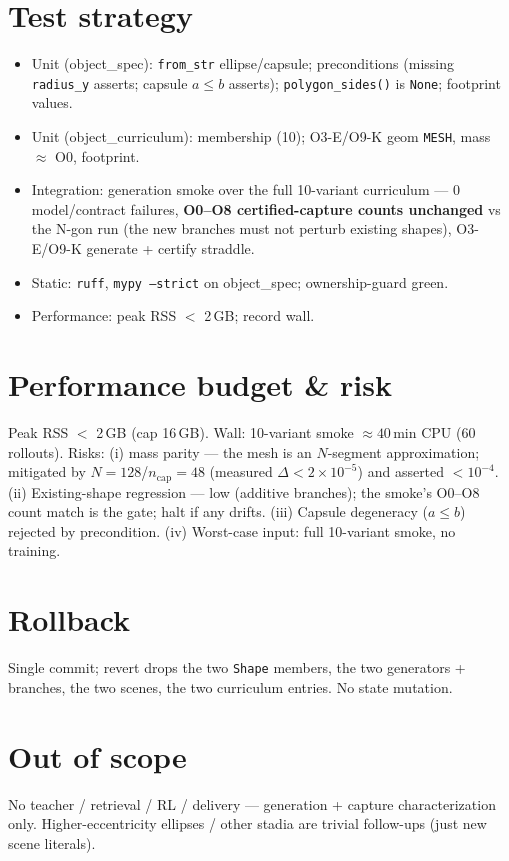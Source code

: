 \documentclass[11pt]{article}
\begin{document}
\section{Test strategy}
\begin{itemize}[nosep]
  \item Unit (object\_spec): \texttt{from\_str} ellipse/capsule; preconditions (missing \texttt{radius\_y}
    asserts; capsule $a\le b$ asserts); \texttt{polygon\_sides()} is \texttt{None}; footprint values.
  \item Unit (object\_curriculum): membership (10); O3-E/O9-K geom \texttt{MESH}, mass $\approx$ O0, footprint.
  \item Integration: generation smoke over the full 10-variant curriculum --- 0 model/contract failures,
    \textbf{O0--O8 certified-capture counts unchanged} vs the N-gon run (the new branches must not perturb
    existing shapes), O3-E/O9-K generate + certify straddle.
  \item Static: \texttt{ruff}, \texttt{mypy --strict} on object\_spec; ownership-guard green.
  \item Performance: peak RSS $<$ 2\,GB; record wall.
\end{itemize}

\section{Performance budget \& risk}
Peak RSS $<$ 2\,GB (cap 16\,GB). Wall: 10-variant smoke $\approx 40$\,min CPU (60 rollouts). Risks:
(i) mass parity --- the mesh is an $N$-segment approximation; mitigated by $N{=}128$/$n_{\text{cap}}{=}48$
(measured $\Delta<2\times10^{-5}$) and asserted $<10^{-4}$. (ii) Existing-shape regression --- low (additive
branches); the smoke's O0--O8 count match is the gate; halt if any drifts. (iii) Capsule degeneracy
($a\le b$) rejected by precondition. (iv) Worst-case input: full 10-variant smoke, no training.

\section{Rollback}
Single commit; revert drops the two \texttt{Shape} members, the two generators + branches, the two scenes,
the two curriculum entries. No state mutation.

\section{Out of scope}
No teacher / retrieval / RL / delivery --- generation + capture characterization only. Higher-eccentricity
ellipses / other stadia are trivial follow-ups (just new scene literals).
\end{document}
